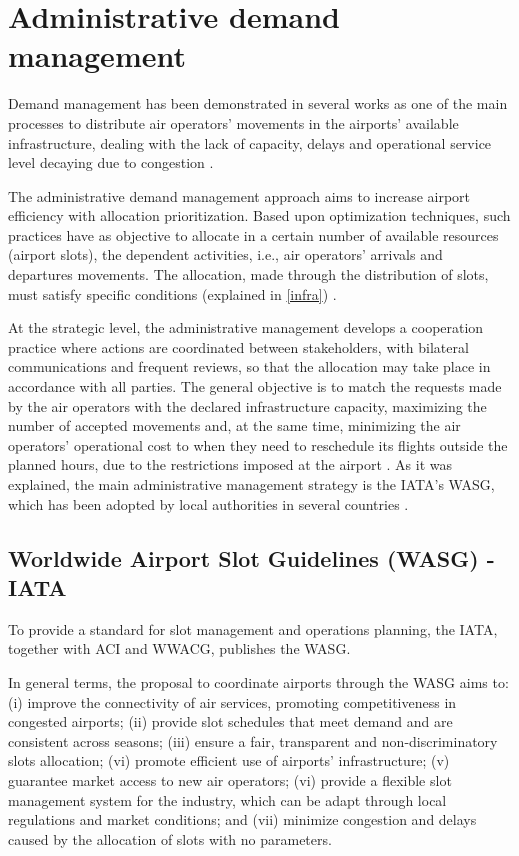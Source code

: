 \section{Administrative demand management}
Demand management has been demonstrated in several works as one of the main processes to distribute air operators’ movements in the airports’ available infrastructure, dealing with the lack of capacity, delays and operational service level decaying due to congestion \cite{zografos2017increasing, ribeiro2018optimization}.

The administrative demand management approach aims to increase airport efficiency with allocation prioritization. Based upon optimization techniques, such practices have as objective to allocate in a certain number of available resources (airport slots), the dependent activities, i.e., air operators’ arrivals and departures movements. The allocation, made through the distribution of slots, must satisfy specific conditions (explained in \ref{infra}) \cite{zografos2017increasing}.

At the strategic level, the administrative management develops a cooperation practice where actions are coordinated between stakeholders, with bilateral communications and frequent reviews, so that the allocation may take place in accordance with all parties. The general objective is to match the requests made by the air operators with the declared infrastructure capacity, maximizing the number of accepted movements and, at the same time, minimizing the air operators’ operational cost to when they need to reschedule its flights outside the planned hours, due to the restrictions imposed at the airport \cite {gillen2016airport}. As it was explained, the main administrative management strategy is the \acrshort{IATA}’s \acrshort{WASG}, which has been adopted by local authorities in several countries \cite{zografos2017increasing, fairbrother2018development, cavusoglu2021minimum}.

\subsection{Worldwide Airport Slot Guidelines (\acrshort{WASG}) - \acrshort{IATA}}
To provide a standard for slot management and operations planning, the \acrshort{IATA}, together with \acrfull{ACI} and \acrfull{WWACG}, publishes the \acrshort{WASG}\cite{WASG2020}.

In general terms, the proposal to coordinate airports through the \acrshort{WASG} aims to: (i) improve the connectivity of air services, promoting competitiveness in congested airports; (ii) provide slot schedules that meet demand and are consistent across seasons; (iii) ensure a fair, transparent and non-discriminatory slots allocation; (vi) promote efficient use of airports’ infrastructure; (v) guarantee market access to new air operators; (vi) provide a flexible slot management system for the industry, which can be adapt through local regulations and market conditions; and (vii) minimize congestion and delays caused by the allocation of slots with no parameters.


